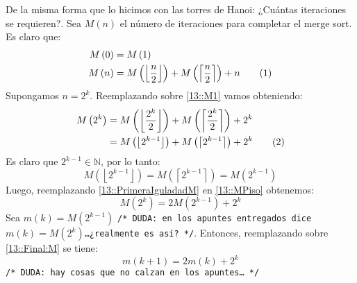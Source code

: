 \documentclass[english, spanish, fleqn, 10pt]{article}
\newcommand{\comentarioc}[1]{\texttt{\textcolor{webred}{/* #1 */}}}
\numberwithin{equation}{section}
\newcommand{\nparentesis}[1]{\left( #1 \right)}
\theoremstyle{definition}
\newcommand\numberthis{\addtocounter{equation}{1}\tag{\theequation}}
\begin{document}
De la misma forma que lo hicimos con las torres de Hanoi: ¿Cuántas iteraciones se requieren?. Sea $M\nparentesis{n}$ el número de iteraciones  para completar el merge sort. Es claro que:
\begin{align*}
M\nparentesis{0}&=M\nparentesis{1}\\
M\nparentesis{n}&=M\nparentesis{\left \lfloor\frac{n}{2}\right\rfloor}+M\nparentesis{\left \lceil \frac{n}{2}\right \rceil}+n\numberthis\label{13::M1}
\end{align*}
Supongamos $n=2^k$. Reemplazando sobre \eqref{13::M1} vamos obteniendo:
\begin{align*}
M\nparentesis{2^k}&=M\nparentesis{\left\lfloor \dfrac{2^k}{2}\right\rfloor}+M\nparentesis{\left\lceil \dfrac{2^k}{2}\right\rceil}+2^k\\
&=M\nparentesis{\left\lfloor 2^{k-1}\right \rfloor}+M\nparentesis{\left\lceil 2^{k-1}\right \rceil}+2^k\numberthis\label{13::MPiso}
\end{align*}
Es claro que $2^{k-1}\in\mathbb{N}$, por lo tanto:
\begin{equation}\label{13::PrimeraIguladadM}
M\nparentesis{\left\lfloor 2^{k-1}\right \rfloor}=M\nparentesis{\left\lceil 2^{k-1}\right \rceil}=M\nparentesis{2^{k-1}}
\end{equation}
Luego, reemplazando \eqref{13::PrimeraIguladadM} en \eqref{13::MPiso} obtenemos:
\begin{equation}\label{13::Final:M}
M\nparentesis{2^k}=2M\nparentesis{2^{k-1}}+2^k
\end{equation}
Sea $m\nparentesis{k}=M\nparentesis{2^{k-1}}$ \comentarioc{DUDA: en los apuntes entregados dice $m\nparentesis{k}=M\nparentesis{2^k}$\ldots ¿realmente es así?}. Entonces, reemplazando sobre \eqref{13::Final:M} se tiene:
\begin{equation}
m\nparentesis{k+1}=2m\nparentesis{k}+2^k
\end{equation}
\comentarioc{DUDA: hay cosas que no calzan en los apuntes\ldots }
\end{document}
